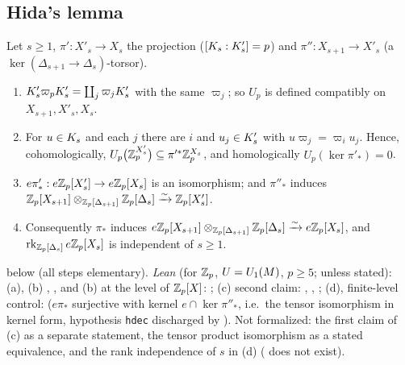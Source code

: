 \subsection{Hida's lemma}

\begin{lemma}\label{lem:s04-hida}
Let $s\ge1$, $\pi':X'_s\to X_s$ the projection ($[K_{s}:K'_{s}]=p$) and $\pi'':X_{s+1}\to X'_s$ (a $\ker(\Delta_{s+1}\to\Delta_s)$-torsor).
\begin{enumerate}[label=(\alph*)]
\item $K'_{s}\varpi_pK'_{s}=\coprod_j\varpi_jK'_{s}$ with the same $\varpi_j$; so $U_p$ is defined compatibly on $X_{s+1},X'_s,X_s$.
\item For $u\in K_{s}$ and each $j$ there are $i$ and $u_j\in K'_{s}$ with $u\varpi_j=\varpi_iu_j$. Hence, cohomologically,
  $U_p\big(\mathbb{Z}_p^{X'_s}\big)\subseteq\pi'^*\mathbb{Z}_p^{X_s}$, and homologically $U_p(\ker\pi'_*)=0$.
\item $e\pi'_*:e\mathbb{Z}_p[X'_s]\to e\mathbb{Z}_p[X_s]$ is an isomorphism; and $\pi''_*$ induces $\mathbb{Z}_p[X_{s+1}]\otimes_{\mathbb{Z}_p[\Delta_{s+1}]}\mathbb{Z}_p[\Delta_s]
  \xrightarrow{\sim}\mathbb{Z}_p[X'_s]$.
\item Consequently $\pi_*$ induces $e\mathbb{Z}_p[X_{s+1}]\otimes_{\mathbb{Z}_p[\Delta_{s+1}]}\mathbb{Z}_p[\Delta_s]\xrightarrow{\sim}e\mathbb{Z}_p[X_s]$, and
  $\operatorname{rk}_{\mathbb{Z}_p[\Delta_s]}e\mathbb{Z}_p[X_s]$ is independent of $s\ge1$.
\end{enumerate}
\stproved{} below (all steps elementary). \emph{Lean} (for $\mathbb{Z}_p$, $U=U_1(M)$, $p\ge5$; \stformal{} unless stated): (a), (b)
, , and (b) at the level of $\mathbb{Z}_p[X]$:
; (c) second claim:
, , ; (d), finite-level
control:  ($e\pi_*$ surjective with kernel $e\cap\ker\pi''_*$, i.e.\ the tensor isomorphism in
kernel form, hypothesis \texttt{hdec} discharged by ). Not formalized: the first claim of (c) as a separate statement,
the tensor product isomorphism as a stated equivalence, and the rank independence of $s$ in (d) ( does not exist).
\end{lemma}

